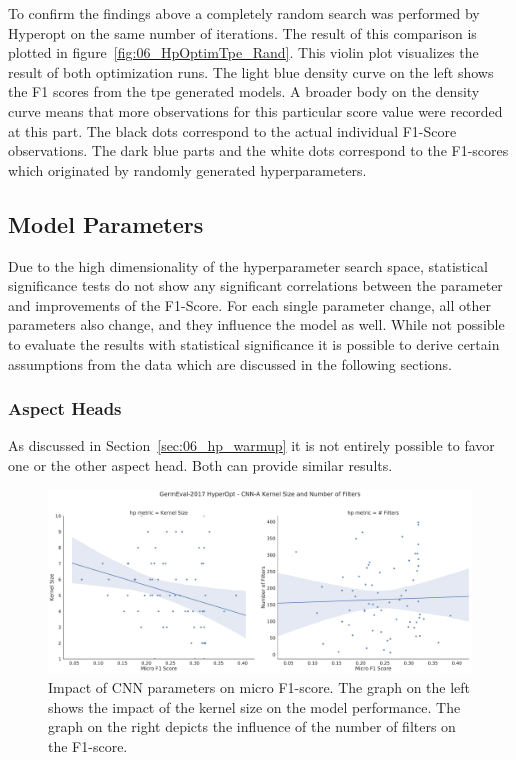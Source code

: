To confirm the findings above a completely random search was performed by Hyperopt on the same number of iterations. The result of this comparison is plotted in figure~\ref{fig:06_HpOptimTpe_Rand}. This violin plot visualizes the result of both optimization runs. The light blue density curve on the left shows the F1 scores from the \gls{tpe} generated models. A broader body on the density curve means that more observations for this particular score value were recorded at this part. The black dots correspond to the actual individual F1-Score observations. The dark blue parts and the white dots correspond to the F1-scores which originated by randomly generated hyperparameters.

\subsection{Model Parameters}

Due to the high dimensionality of the hyperparameter search space, statistical significance tests do not show any significant correlations between the parameter and improvements of the F1-Score. For each single parameter change, all other parameters also change, and they influence the model as well. While not possible to evaluate the results with statistical significance it is possible to derive certain assumptions from the data which are discussed in the following sections.

\subsubsection{Aspect Heads}

As discussed in Section~\ref{sec:06_hp_warmup} it is not entirely possible to favor one or the other aspect head. Both can provide similar results. 

\begin{figure}[ht]
    \centering
    \includegraphics[width=\textwidth]{figures/06_results/06_hp_ge_lm_cnnParams_test}
    \caption{Impact of CNN parameters on micro F1-score. The graph on the left shows the impact of the kernel size on the model performance. The graph on the right depicts the influence of the number of filters on the F1-score.}
    \label{fig:06_HpOptim_CnnParams}
\end{figure}

